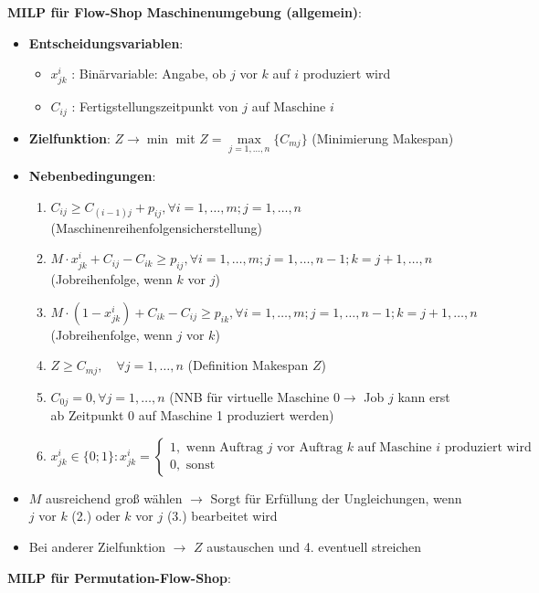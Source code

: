 \textbf{MILP für Flow-Shop Maschinenumgebung (allgemein)}:
\begin{itemize}
	\item \textbf{Entscheidungsvariablen}:
	\begin{itemize}
		\item $x_{jk}^{i}$ : Binärvariable: Angabe, ob $j$ vor $k$ auf $i$ produziert wird
		\item $C_{ij}$ : Fertigstellungszeitpunkt von $j$ auf Maschine $i$
	\end{itemize}
	\item \textbf{Zielfunktion}: $Z \rightarrow \min$ mit $Z=\max\limits_{j=1,\ldots,n}\{C_{mj}\}$ (Minimierung Makespan)
	\item \textbf{Nebenbedingungen}:
	\begin{enumerate}
		\item $C_{i j} \geq C_{(i-1) j}+p_{i j}, \forall i=1, \ldots, m ; j=1, \ldots, n$ (Maschinenreihenfolgensicherstellung)
		\item $M \cdot x_{j k}^{i}+C_{i j}-C_{i k} \geq p_{i j}, \forall i=1, \ldots, m ; j=1, \ldots, n-1 ; k=j+1, \ldots, n$ (Jobreihenfolge, wenn $k$ vor $j$)
		\item $M \cdot\left(1-x_{j k}^{i}\right)+C_{i k}-C_{i j} \geq p_{i k}, \forall i=1, \ldots, m ; j=1, \ldots, n-1 ; k=j+1, \ldots, n$ (Jobreihenfolge, wenn $j$ vor $k$)
		\item $Z \geq C_{m j}, \quad \forall j=1, \ldots, n$ (Definition Makespan $Z$)
		\item $C_{0 j}=0, \forall j=1, \ldots, n$ (NNB für virtuelle Maschine $0 \rightarrow$ Job $j$ kann erst ab Zeitpunkt 0 auf Maschine 1 produziert werden)
		\item $x_{j k}^{i} \in\{0 ; 1\}: x_{j k}^{i}=\left\{\begin{array}{l}1, \text { wenn Auftrag } j \text { vor Auftrag } k \text { auf Maschine } i \text{ produziert wird } \\ 0, \text { sonst }\end{array}\right.$
	\end{enumerate}
	\item $M$ ausreichend groß wählen $\rightarrow$ Sorgt für Erfüllung der Ungleichungen, wenn $j$ vor $k$ (2.) oder $k$ vor $j$ (3.) bearbeitet wird
	\item Bei anderer Zielfunktion $\rightarrow$ $Z$ austauschen und 4. eventuell streichen
\end{itemize}
\bigskip
\textbf{MILP für Permutation-Flow-Shop}:
